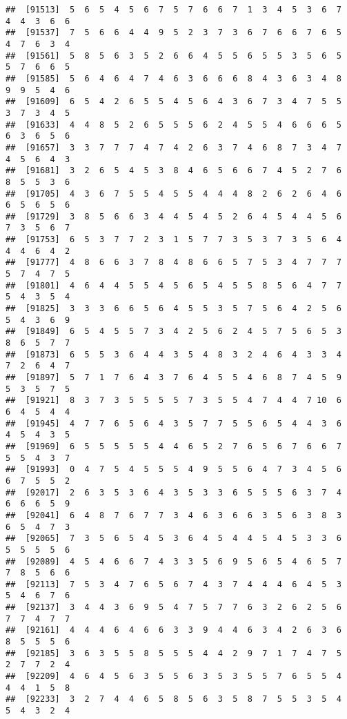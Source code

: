 \documentclass[
]{book}
\begin{document}
\begin{verbatim}
##  [91513]  5  6  5  4  5  6  7  5  7  6  6  7  1  3  4  5  3  6  7  4  4  3  6  6
##  [91537]  7  5  6  6  4  4  9  5  2  3  7  3  6  7  6  6  7  6  5  4  7  6  3  4
##  [91561]  5  8  5  6  3  5  2  6  6  4  5  5  6  5  5  3  5  6  5  5  7  6  6  5
##  [91585]  5  6  4  6  4  7  4  6  3  6  6  6  8  4  3  6  3  4  8  9  9  5  4  6
##  [91609]  6  5  4  2  6  5  5  4  5  6  4  3  6  7  3  4  7  5  5  3  7  3  4  5
##  [91633]  4  4  8  5  2  6  5  5  5  6  2  4  5  5  4  6  6  6  5  6  3  6  5  6
##  [91657]  3  3  7  7  7  4  7  4  2  6  3  7  4  6  8  7  3  4  7  4  5  6  4  3
##  [91681]  3  2  6  5  4  5  3  8  4  6  5  6  6  7  4  5  2  7  6  8  5  5  3  6
##  [91705]  4  3  6  7  5  5  4  5  5  4  4  4  8  2  6  2  6  4  6  6  5  6  5  6
##  [91729]  3  8  5  6  6  3  4  4  5  4  5  2  6  4  5  4  4  5  6  7  3  5  6  7
##  [91753]  6  5  3  7  7  2  3  1  5  7  7  3  5  3  7  3  5  6  4  4  4  6  4  2
##  [91777]  4  8  6  6  3  7  8  4  8  6  6  5  7  5  3  4  7  7  7  5  7  4  7  5
##  [91801]  4  6  4  4  5  5  4  5  6  5  4  5  5  8  5  6  4  7  7  5  4  3  5  4
##  [91825]  3  3  3  6  6  5  6  4  5  5  3  5  7  5  6  4  2  5  6  5  4  3  6  9
##  [91849]  6  5  4  5  5  7  3  4  2  5  6  2  4  5  7  5  6  5  3  8  6  5  7  7
##  [91873]  6  5  5  3  6  4  4  3  5  4  8  3  2  4  6  4  3  3  4  7  2  6  4  7
##  [91897]  5  7  1  7  6  4  3  7  6  4  5  5  4  6  8  7  4  5  9  5  3  5  7  5
##  [91921]  8  3  7  3  5  5  5  5  7  3  5  5  4  7  4  4  7 10  6  6  4  5  4  4
##  [91945]  4  7  7  6  5  6  4  3  5  7  7  5  5  6  5  4  4  3  6  4  5  4  3  5
##  [91969]  6  5  5  5  5  5  4  4  6  5  2  7  6  5  6  7  6  6  7  5  5  4  3  7
##  [91993]  0  4  7  5  4  5  5  5  4  9  5  5  6  4  7  3  4  5  6  6  7  5  5  2
##  [92017]  2  6  3  5  3  6  4  3  5  3  3  6  5  5  5  6  3  7  4  6  6  6  5  9
##  [92041]  6  4  8  7  6  7  7  3  4  6  3  6  6  3  5  6  3  8  3  6  5  4  7  3
##  [92065]  7  3  5  6  5  4  5  3  6  4  5  4  4  5  4  5  3  3  6  5  5  5  5  6
##  [92089]  4  5  4  6  6  7  4  3  3  5  6  9  5  6  5  4  6  5  7  7  8  5  6  6
##  [92113]  7  5  3  4  7  6  5  6  7  4  3  7  4  4  4  6  4  5  3  5  4  6  7  6
##  [92137]  3  4  4  3  6  9  5  4  7  5  7  7  6  3  2  6  2  5  6  7  7  4  7  7
##  [92161]  4  4  4  6  4  6  6  3  3  9  4  4  6  3  4  2  6  3  6  8  5  5  5  6
##  [92185]  3  6  3  5  5  8  5  5  5  4  4  2  9  7  1  7  4  7  5  2  7  7  2  4
##  [92209]  4  6  4  5  6  3  5  5  6  3  5  3  5  5  7  6  5  5  4  4  4  1  5  8
##  [92233]  3  2  7  4  4  6  5  8  5  6  3  5  8  7  5  5  3  5  4  5  4  3  2  4

\end{verbatim}
\end{document}
